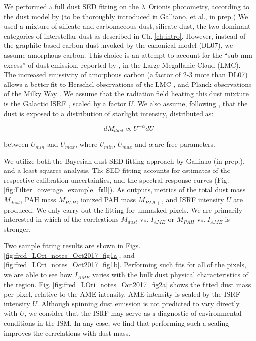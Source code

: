           We performed a full dust SED fitting on the $\lambda$~Orionis photometry, according to the dust model by \cite{galliano11} (to be thoroughly introduced in Galliano, et al., in prep.)  We used a mixture of silicate and carbonaceous dust, silicate dust, the two dominant categories of interstellar dust as described in Ch. \ref{ch:intro}. However, instead of the graphite-based carbon dust invoked by the canonical \cite{draine07} model (DL07), we assume amorphous carbon. This choice is an attempt to account for the ``sub-mm excess'' of dust emission, reported by \cite{israel10, bot10}, in the Large Megallanic Cloud (LMC). The increased emissivity of amorphous carbon (a factor of 2-3 more than DL07) allows a better fit to Herschel observations of the LMC \citep{galliano11}, and Planck observations of the Milky Way \citep{planckIntXXIX16}. We assume that the radiation field heating this dust mixture is the Galactic ISRF \citep{mathis83}, scaled by a factor $U$. We also assume, following \cite{dale01}, that the dust is exposed to a distribution of starlight intensity, distributed as:

          \begin{equation}
             \label{eq:U}
               dM_{dust}\propto{} U^{-\alpha}dU
          \end{equation}

          between $U_{min}$ and $U_{max}$, where $U_{min}$, $U_{max}$ and $\alpha{}$ are free parameters.

          We utilize both the Bayesian dust SED fitting approach by Galliano (in prep.), and a least-squares analysis. The SED fitting accounts for estimates of the respective calibration uncertainties, and the spectral response curves (Fig. \ref{fig:Filter_coverage_example_full}). As outputs, metrics of the total dust mass $M_{dust}$, PAH mass $M_{PAH}$, ionized PAH mass $M_{PAH+}$, and ISRF intensity $U$ are produced. We only carry out the fitting for unmasked pixels. We are primarily interested in which of the corrleations $M_{dust}$ vs. $I_{AME}$ or $M_{PAH}$ vs. $I_{AME}$ is stronger.

          Two sample fitting results are shown in Figs.  \ref{fig:fred_LOri_notes_Oct2017_fig1a}, and \ref{fig:fred_LOri_notes_Oct2017_fig1b}. Performing such fits for all of the pixels, we are able to see how $I_{AME}$ varies with the bulk dust physical characteristics of the region. Fig. \ref{fig:fred_LOri_notes_Oct2017_fig2a} shows the fitted dust mass per pixel, relative to the AME intensity. AME intensity is scaled by the ISRF intensity $U$. Although spinning dust emission is not predicted to vary directly with $U$, we consider that the ISRF may serve as a diagnostic of environmental conditions in the ISM. In any case, we find that performing such a scaling improves the correlations with dust mass.


